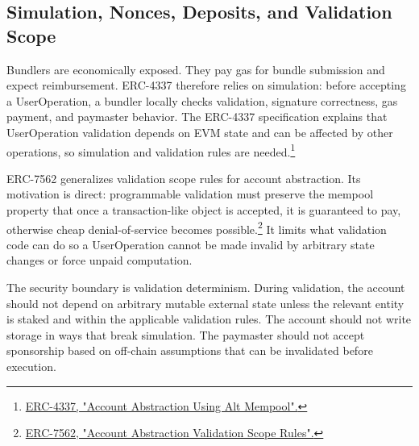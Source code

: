 \subsection{Simulation, Nonces, Deposits, and Validation Scope}

Bundlers are economically exposed. They pay gas for bundle submission and expect reimbursement. ERC-4337 therefore relies on simulation: before accepting a UserOperation, a bundler locally checks validation, signature correctness, gas payment, and paymaster behavior. The ERC-4337 specification explains that UserOperation validation depends on EVM state and can be affected by other operations, so simulation and validation rules are needed.\footnote{\href{https://eips.ethereum.org/EIPS/eip-4337}{ERC-4337, "Account Abstraction Using Alt Mempool".}}

ERC-7562 generalizes validation scope rules for account abstraction. Its motivation is direct: programmable validation must preserve the mempool property that once a transaction-like object is accepted, it is guaranteed to pay, otherwise cheap denial-of-service becomes possible.\footnote{\href{https://eips.ethereum.org/EIPS/eip-7562}{ERC-7562, "Account Abstraction Validation Scope Rules".}} It limits what validation code can do so a UserOperation cannot be made invalid by arbitrary state changes or force unpaid computation.

The security boundary is validation determinism. During validation, the account should not depend on arbitrary mutable external state unless the relevant entity is staked and within the applicable validation rules. The account should not write storage in ways that break simulation. The paymaster should not accept sponsorship based on off-chain assumptions that can be invalidated before execution.

